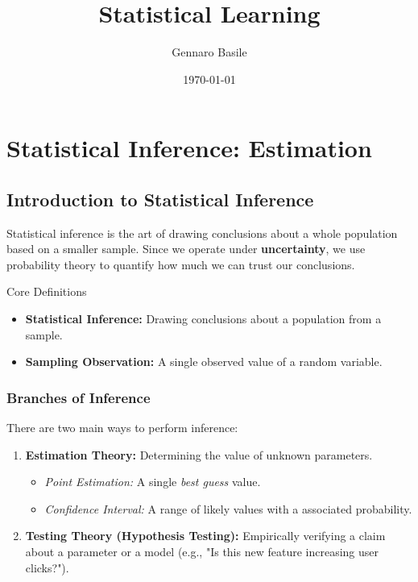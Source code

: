 \documentclass[11pt]{article}
\title{\Huge Statistical Learning}
\author{\Large Gennaro Basile}
\date{\today}
\theoremstyle{smallexample}
\begin{document}
\maketitle
{}
\captionsetup[figure]{labelfont=bf}

\pagebreak

\tableofcontents
\pagebreak
\section{Statistical Inference: Estimation}

\subsection{Introduction to Statistical Inference}
Statistical inference is the art of drawing conclusions about a whole population based on a smaller sample. Since we operate under \textbf{uncertainty}, we use probability theory to quantify how much we can trust our conclusions.

\begin{defbox}{Core Definitions}
\begin{itemize}
    \item \textbf{Statistical Inference:} Drawing conclusions about a population from a sample.
    \item \textbf{Sampling Observation:} A single observed value of a random variable.
\end{itemize}
\end{defbox}


\subsubsection{Branches of Inference}
There are two main ways to perform inference:
\begin{enumerate}
    \item \textbf{Estimation Theory:} Determining the value of unknown parameters.
    \begin{itemize}
        \item \textit{Point Estimation:} A single \textit{best guess} value.
        \item \textit{Confidence Interval:} A range of likely values with a associated probability.
    \end{itemize}
    \item \textbf{Testing Theory (Hypothesis Testing):} Empirically verifying a claim about a parameter or a model (e.g., "Is this new feature increasing user clicks?").
\end{enumerate}
\end{document}

